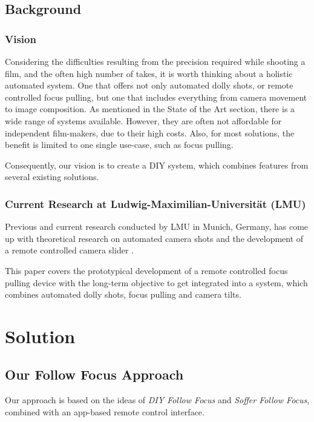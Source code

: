 \documentclass{sigchi}
\begin{document}
\subsection{Background}

\subsubsection{Vision}

Considering the difficulties resulting from the precision required while shooting a film, and the often high number of takes, it is worth thinking about a holistic automated system. One that offers not only automated dolly shots, or remote controlled focus pulling, but one that includes everything from camera movement to image composition. As mentioned in the State of the Art section, there is a wide range of systems available. However, they are often not affordable for independent film-makers, due to their high costs. Also, for most solutions, the benefit is limited to one single use-case, such as focus pulling. 

Consequently, our vision is to create a DIY system, which combines features from several existing solutions.    


\subsubsection{Current Research at Ludwig-Maximilian-Universit\"at (LMU)}

Previous and current research conducted by LMU in Munich, Germany, has come up with theoretical research on automated camera shots \cite{pburgdorf} and the development of a remote controlled camera slider \cite{pmoerwald}. 

This paper covers the prototypical development of a remote controlled focus pulling device with the long-term objective to get integrated into a system, which combines automated dolly shots, focus pulling and camera tilts.

\section{Solution}

\subsection{Our Follow Focus Approach}
Our approach is based on the ideas of \textit{DIY Follow Focus} \cite{diyff} and \textit{Soffer Follow Focus}, combined with an app-based remote control interface.
\end{document}
